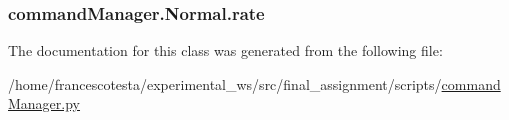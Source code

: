 \subsubsection[{\texorpdfstring{rate}{rate}}]{\setlength{\rightskip}{0pt plus 5cm}command\+Manager.\+Normal.\+rate}\hypertarget{classcommandManager_1_1Normal_a32e84cf5ac08ffeb9cb1a21d4b484a32}{}\label{classcommandManager_1_1Normal_a32e84cf5ac08ffeb9cb1a21d4b484a32}


The documentation for this class was generated from the following file\+:\begin{DoxyCompactItemize}
\item 
/home/francescotesta/experimental\+\_\+ws/src/final\+\_\+assignment/scripts/\hyperlink{commandManager_8py}{command\+Manager.\+py}\end{DoxyCompactItemize}
